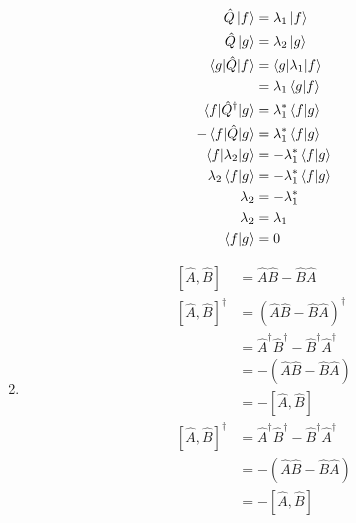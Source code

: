 \documentclass{article}
\begin{document}
\begin{enumerate}
        \begin{align*}
          \hat{Q} \ket{f}                  & = \lambda_1 \ket{f}           \\
          \hat{Q} \ket{g}                  & = \lambda_2 \ket{g}           \\
          \braket{g | \hat{Q} | f}         & = \braket{g | \lambda_1 | f}  \\
                                           & = \lambda_1 \braket{g | f}    \\
          \braket{f | \hat{Q}^\dagger | g} & = \lambda_1^* \braket{f | g}  \\
          -\braket{f | \hat{Q} | g}        & = \lambda_1^* \braket{f | g}  \\
          \braket{f | \lambda_2 | g}       & = -\lambda_1^* \braket{f | g} \\
          \lambda_2 \braket{f | g}         & = -\lambda_1^* \braket{f | g} \\
          \lambda_2                        & = -\lambda_1^*                \\
          \lambda_2                        & = \lambda_1                   \\
          \braket{f | g}                   & = 0
        \end{align*}

  \item

        \begin{align*}
          [\hat{A}, \hat{B}]         & = \hat{A} \hat{B} - \hat{B} \hat{A}                                 \\
          [\hat{A}, \hat{B}]^\dagger & = (\hat{A} \hat{B} - \hat{B} \hat{A})^\dagger                       \\
                                     & = \hat{A}^\dagger \hat{B}^\dagger - \hat{B}^\dagger \hat{A}^\dagger \\
                                     & = -(\hat{A} \hat{B} - \hat{B} \hat{A})                              \\
                                     & = -[\hat{A}, \hat{B}]                                               \\
          [\hat{A}, \hat{B}]^\dagger & = \hat{A}^\dagger \hat{B}^\dagger - \hat{B}^\dagger \hat{A}^\dagger \\
                                     & = -(\hat{A} \hat{B} - \hat{B} \hat{A})                              \\
                                     & = -[\hat{A}, \hat{B}]
        \end{align*}


\end{enumerate}
\end{document}
